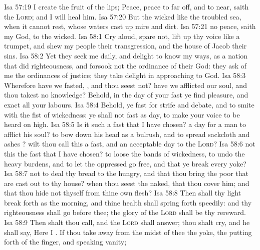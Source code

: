 \vs Isa 57:19 I create the fruit of the lips; Peace, peace to  far off, and to  near, saith the \textsc{Lord}; and I will heal him.
\vs Isa 57:20 But the wicked  like the troubled sea, when it cannot rest, whose waters cast up mire and dirt.
\vs Isa 57:21  no peace, saith my God, to the wicked.
\vs Isa 58:1 Cry aloud, spare not, lift up thy voice like a trumpet, and shew my people their transgression, and the house of Jacob their sins.
\vs Isa 58:2 Yet they seek me daily, and delight to know my ways, as a nation that did righteousness, and forsook not the ordinance of their God: they ask of me the ordinances of justice; they take delight in approaching to God.
\vs Isa 58:3 Wherefore have we fasted, , and thou seest not?  have we afflicted our soul, and thou takest no knowledge? Behold, in the day of your fast ye find pleasure, and exact all your labours.
\vs Isa 58:4 Behold, ye fast for strife and debate, and to smite with the fist of wickedness: ye shall not fast as  day, to make your voice to be heard on high.
\vs Isa 58:5 Is it such a fast that I have chosen? a day for a man to afflict his soul?  to bow down his head as a bulrush, and to spread sackcloth and ashes ? wilt thou call this a fast, and an acceptable day to the \textsc{Lord}?
\vs Isa 58:6  not this the fast that I have chosen? to loose the bands of wickedness, to undo the heavy burdens, and to let the oppressed go free, and that ye break every yoke?
\vs Isa 58:7  not to deal thy bread to the hungry, and that thou bring the poor that are cast out to thy house? when thou seest the naked, that thou cover him; and that thou hide not thyself from thine own flesh?
\vs Isa 58:8 Then shall thy light break forth as the morning, and thine health shall spring forth speedily: and thy righteousness shall go before thee; the glory of the \textsc{Lord} shall be thy rereward.
\vs Isa 58:9 Then shalt thou call, and the \textsc{Lord} shall answer; thou shalt cry, and he shall say, Here I . If thou take away from the midst of thee the yoke, the putting forth of the finger, and speaking vanity;
